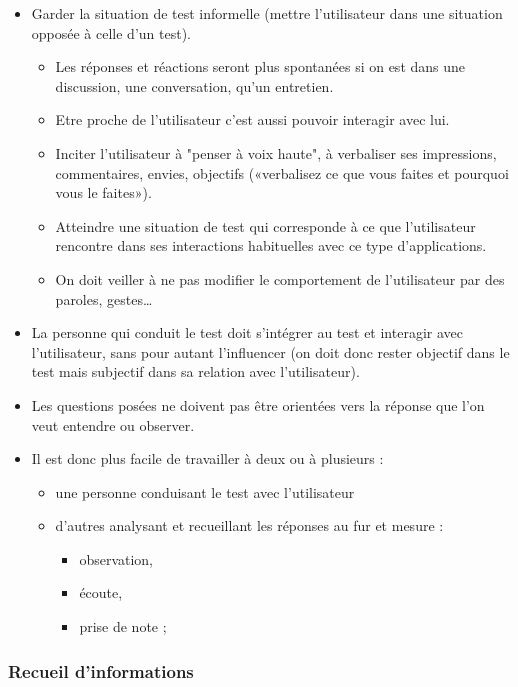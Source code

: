 \begin{frame}[allowframebreaks]
\begin {itemize}
					\item Garder la situation de test informelle (mettre l'utilisateur dans une situation opposée à celle d'un test). 
						\begin {itemize}
						\item Les réponses et réactions seront plus spontanées si on est dans une discussion, une conversation, qu'un entretien. 
						\item Etre proche de l'utilisateur c'est aussi pouvoir interagir avec lui. 
						\item Inciter l'utilisateur à "penser à voix haute", à verbaliser ses impressions, commentaires, envies, objectifs («verbalisez ce que vous faites et pourquoi vous le faites»). 
						\item Atteindre une situation de test qui corresponde à ce que l'utilisateur rencontre dans ses interactions habituelles avec ce type d'applications. 
						\item On doit veiller à ne pas modifier le comportement de l'utilisateur par des paroles, gestes…
						\end{itemize}
					\item La personne qui conduit le test doit s'intégrer au test et interagir avec l'utilisateur, sans pour autant l'influencer (on doit donc rester objectif dans le test mais subjectif dans sa relation avec l'utilisateur).
					\item Les questions posées ne doivent pas être orientées vers la réponse que l'on veut entendre ou observer. 
					\item Il est donc plus facile de travailler à deux ou à plusieurs : 
						\begin {itemize}
						\item une personne conduisant le test avec l'utilisateur
						\item d'autres analysant et recueillant les réponses au fur et mesure :
							\begin {itemize} 
							\item observation, 
							\item écoute, 
							\item prise de note ;
							\end{itemize}
						\end{itemize}
					\end{itemize}	
		\end{frame}  
		
		 \subsubsection{Recueil d'informations} 
		

